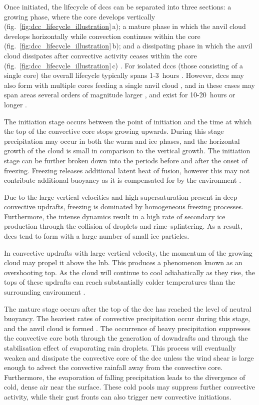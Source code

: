 Once initiated, the lifecycle of \acrshort{dcc}s can be separated into three sections: a growing phase, where the core develops vertically (fig.~\ref{fig:dcc_lifecycle_illustration}\,a); a mature phase in which the anvil cloud develops horizontally while convection continues within the core (fig.~\ref{fig:dcc_lifecycle_illustration}\,b); and a dissipating phase in which the anvil cloud dissipates after convective activity ceases within the core (fig.~\ref{fig:dcc_lifecycle_illustration}\,c) \citep{wall_life_2018}.
For isolated \acrshort{dcc}s (those consisting of a single core) the overall lifecycle typically spans 1-3~hours \citep{chen_diurnal_1997}.
However, \acrshort{dcc}s may also form with multiple cores feeding a single anvil cloud \citep{roca_simple_2017}, and in these cases may span areas several orders of magnitude larger \citep{houze_mesoscale_2004}, and exist for 10-20~hours or longer \citep{chen_diurnal_1997}.

The initiation stage occurs between the point of initiation and the time at which the top of the convective core stops growing upwards.
During this stage precipitation may occur in both the warm and ice phases, and the horizontal growth of the cloud is small in comparison to the vertical growth.
The initiation stage can be further broken down into the periods before and after the onset of freezing.
Freezing releases additional latent heat of fusion, however this may not contribute additional buoyancy as it is compensated for by the environment \citep{seeley_tropical_2016}.

Due to the large vertical velocities and high supersaturation present in deep convective updrafts, freezing is dominated by homogeneous freezing processes.
Furthermore, the intense dynamics result in a high rate of secondary ice production through the collision of droplets and rime--splintering.
As a result, \acrshort{dcc}s tend to form with a large number of small ice particles.

In convective updrafts with large vertical velocity, the momentum of the growing cloud may propel it above the \acrshort{lnb}.
This produces a phenomenon known as an overshooting top.
As the cloud will continue to cool adiabatically as they rise, the tops of these updrafts can reach substantially colder temperatures than the surrounding environment \citep{proud_recordlow_2021}.

The mature stage occurs after the top of the \acrshort{dcc} has reached the level of neutral buoyancy.
The heaviest rates of convective precipitation occur during this stage, and the anvil cloud is formed \citep{houze_chapter_2014}.
The occurrence of heavy precipitation suppresses the convective core both through the generation of downdrafts and through the stabilisation effect of evaporating rain droplets.
This process will eventually weaken and dissipate the convective core of the \acrshort{dcc} unless the wind shear is large enough to advect the convective rainfall away from the convective core.
Furthermore, the evaporation of falling precipitation leads to the divergence of cold, dense air near the surface.
These cold pools may suppress further convective activity, while their gust fronts can also trigger new convective initiations.

